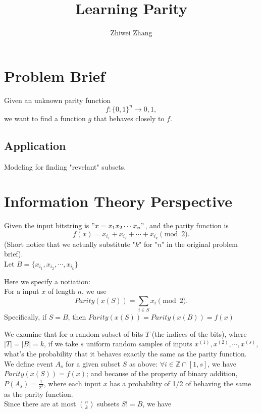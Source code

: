 \documentclass[12pt]{article}
\newenvironment{definition}[2][Definition]{\begin{trivlist}
		\item[\hskip \labelsep {\bfseries #1}\hskip \labelsep {\bfseries #2.}]}{\end{trivlist}}
\begin{document}
 
 
 
\title{Learning Parity}
\author{Zhiwei Zhang}
 
\maketitle
\section{Problem Brief}
Given an unknown parity function $$f : \{0, 1\} ^ n \to {0, 1},$$ we want to find a function $g$ that behaves closely to $f$. 

\subsection{Application}
Modeling for finding "revelant" subsets.

\section{Information Theory Perspective}
Given the input bitstring is $"x = x_1x_2 \cdots x_n"$, and the parity function is 
$$f(x) = x_{i_1} + x_{i_2} + \cdots + x_{i_k} \pmod 2 .$$
(Short notice that we actually substitute "$k$" for "$n$" in the original problem brief). \\
\newline
Let $B = \{x_{i_1} , x_{i_2} , \cdots , x_{i_k}\}$\\
\begin{definition}[Notation Definition]{}
Here we specify a notiation: \\
For a input $x$ of length $n$, we use 
$$Parity(x(S)) = \sum\limits_{i \in S}x_i \pmod 2.$$  
Specifically, if $S = B$, then $Parity(x(S)) = Parity(x(B)) = f(x)$
\end{definition}

\noindent We examine that for a random subset of bits $T$ (the indices of the bits), where $|T| = |B| = k$, if we take $s$ uniform random samples of inputs $x^{(1)}, x^{(2)}, \cdots, x^{(s)}$, what's the probability that it behaves exactly the same as the parity function.\\
\newline
We define event $A_s$ for a given subset $S$ as above: $\forall i \in \mathbb{Z} \cap [1, s]$, we have $Parity(x(S)) = f(x)$; and because of the property of binary addition, $P(A_s) = \frac{1}{2^s}$, where each input $x$ has a probability of 1/2 of behaving the same as the parity function.\\
\newline
Since there are at most $n \choose k$ subsets $S != B$, we have
\end{document}
